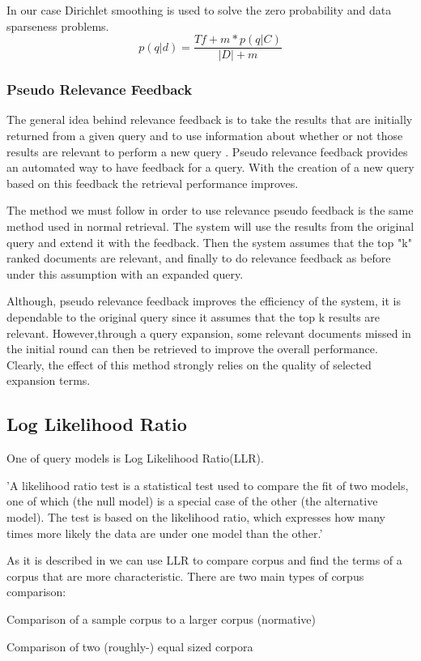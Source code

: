 \documentclass{article}
\begin{document}
In our case Dirichlet smoothing  is used to solve the zero probability and data sparseness problems.
\begin{equation}
p(q|d) =\frac{Tf +m*p(q|C) }{|D| + m}
\end{equation}



\subsubsection{Pseudo Relevance Feedback}

The general idea behind relevance feedback is to take the results that are initially returned from a given query and to use information about whether or not those results are relevant to perform a new query \cite{WikiRelevanceFeedback}.
Pseudo relevance feedback provides an automated way to have feedback for a query. With the creation of a new query based on this feedback the retrieval performance improves.

The method we must follow in order to use relevance pseudo feedback is the same method used in normal retrieval. The system will use the results from the original query and extend it with the feedback. Then the system assumes that the top "k" ranked documents are relevant, and finally to do relevance feedback as before under this assumption with an expanded query.

Although, pseudo relevance feedback improves the efficiency of the system, it is dependable to the original query since it assumes that the top k results are relevant. However,through a query expansion, some relevant documents missed in the initial round can then be retrieved to improve the overall performance. Clearly, the effect of this method strongly relies on the quality of selected expansion terms.


\subsection{Log Likelihood Ratio}

One of query models is Log Likelihood Ratio(LLR).

'A likelihood ratio test is a statistical test used to compare the fit of two models, one of which (the null model) is a special case of the other (the alternative model). The test is based on the likelihood ratio, which expresses how many times more likely the data are under one model than the other.'

As it is described in \cite{RaysonGarside} we can use LLR to compare corpus and find the terms of a corpus that are more characteristic. There are two main types of corpus comparison:
\begin{list}{.}{}
\item Comparison of a sample corpus to a larger corpus (normative)
\item Comparison of two (roughly-) equal sized corpora

\end{list}
\end{document}
